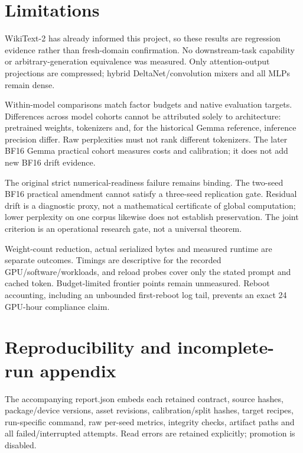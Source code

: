 \documentclass[10pt]{article}
\begin{document}
\section{Limitations}

WikiText-2 has already informed this project, so these results are regression evidence rather than fresh-domain confirmation. No downstream-task capability or arbitrary-generation equivalence was measured. Only attention-output projections are compressed; hybrid DeltaNet/convolution mixers and all MLPs remain dense.

Within-model comparisons match factor budgets and native evaluation targets. Differences across model cohorts cannot be attributed solely to architecture: pretrained weights, tokenizers and, for the historical Gemma reference, inference precision differ. Raw perplexities must not rank different tokenizers. The later BF16 Gemma practical cohort measures costs and calibration; it does not add new BF16 drift evidence.

The original strict numerical-readiness failure remains binding. The two-seed BF16 practical amendment cannot satisfy a three-seed replication gate. Residual drift is a diagnostic proxy, not a mathematical certificate of global computation; lower perplexity on one corpus likewise does not establish preservation. The joint criterion is an operational research gate, not a universal theorem.

Weight-count reduction, actual serialized bytes and measured runtime are separate outcomes. Timings are descriptive for the recorded GPU/software/workloads, and reload probes cover only the stated prompt and cached token. Budget-limited frontier points remain unmeasured. Reboot accounting, including an unbounded first-reboot log tail, prevents an exact 24 GPU-hour compliance claim.

\section{Reproducibility and incomplete-run appendix}

The accompanying report.json embeds each retained contract, source hashes, package/device versions, asset revisions, calibration/split hashes, target recipes, run-specific command, raw per-seed metrics, integrity checks, artifact paths and all failed/interrupted attempts. Read errors are retained explicitly; promotion is disabled.
\end{document}
